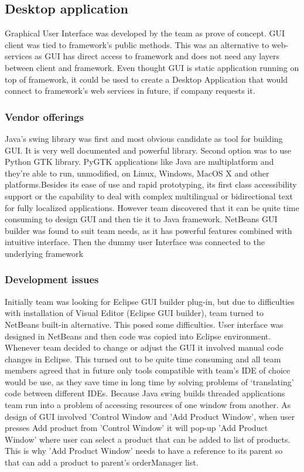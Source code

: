 \documentclass[pdftex,11pt,a4paper]{article}
\begin{document}
\subsection{Desktop application}

Graphical User Interface was developed by the team as prove of concept. GUI client was tied to framework's public methods. This was an alternative to web-services as GUI has direct access to framework and does not need any layers between client and framework. Even thought GUI is static application running on top of framework, it could be used to create a Desktop Application that would connect to framework's web services in future, if company requests it.

\subsubsection{Vendor offerings}
Java's swing library was first and most obvious candidate as tool for building GUI. It is very well documented and powerful library. Second option was to use Python GTK library. PyGTK applications like Java are multiplatform and they're able to run, unmodified, on Linux, Windows, MacOS X and other platforms.Besides its ease of use and rapid prototyping, its first class accessibility support or the capability to deal with complex multilingual or bidirectional text for fully localized applications. However team discovered that it can be quite time consuming to design GUI and then tie it to Java framework.
NetBeans GUI builder was found to suit team needs, as it has powerful features combined with intuitive interface. Then the dummy user Interface was connected to the underlying framework

\subsubsection{Development issues}
Initially team was looking for Eclipse GUI builder plug-in, but due to difficulties with installation of Visual Editor (Eclipse GUI builder), team turned to NetBeans built-in alternative. This posed some difficulties. User interface was designed in NetBeans and then code was copied into Eclipse environment. Whenever team decided to change or adjust the GUI it involved manual code changes in Eclipse. This turned out to be quite time consuming and all team members agreed that in future only tools compatible with team's IDE of choice would be use, as they save time in long time by solving problems of `translating' code between different IDEs.
Because Java swing builds threaded applications team run into a problem of accessing resources of one window from another. As design of GUI involved 'Control Window and 'Add Product Window', when user presses Add product from 'Control Window' it will pop-up 'Add Product Window' where user can select a product that can be added to list of products. This is why 'Add Product Window' needs to have a reference to its parent so that can add a product to parent's orderManager list.
\end{document}

